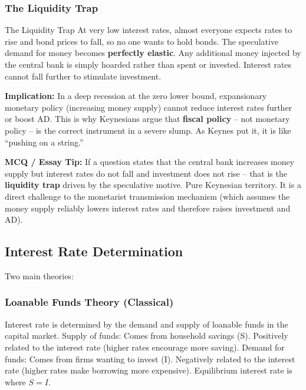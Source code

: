 \documentclass[11pt, a4paper, twoside]{book}
\begin{document}
\subsubsection{The Liquidity Trap}

\begin{keyterm}{The Liquidity Trap}
At very low interest rates, almost everyone expects rates to rise and bond prices to fall, so no one wants to hold bonds. The speculative demand for money becomes \textbf{perfectly elastic}. Any additional money injected by the central bank is simply hoarded rather than spent or invested. Interest rates cannot fall further to stimulate investment.

\textbf{Implication:} In a deep recession at the zero lower bound, expansionary monetary policy (increasing money supply) cannot reduce interest rates further or boost AD. This is why Keynesians argue that \textbf{fiscal policy} -- not monetary policy -- is the correct instrument in a severe slump. As Keynes put it, it is like ``pushing on a string.''
\end{keyterm}

\begin{coreidea}
\textbf{MCQ / Essay Tip:} If a question states that the central bank increases money supply but interest rates do not fall and investment does not rise -- that is the \textbf{liquidity trap} driven by the speculative motive. Pure Keynesian territory. It is a direct challenge to the monetarist transmission mechanism (which assumes the money supply reliably lowers interest rates and therefore raises investment and AD).
\end{coreidea}

\subsection{Interest Rate Determination}

Two main theories:

\subsubsection{Loanable Funds Theory (Classical)}

Interest rate is determined by the demand and supply of loanable funds in the capital market. Supply of funds: Comes from household savings (S). Positively related to the interest rate (higher rates encourage more saving). Demand for funds: Comes from firms wanting to invest (I). Negatively related to the interest rate (higher rates make borrowing more expensive). Equilibrium interest rate is where $S = I$.
\end{document}
